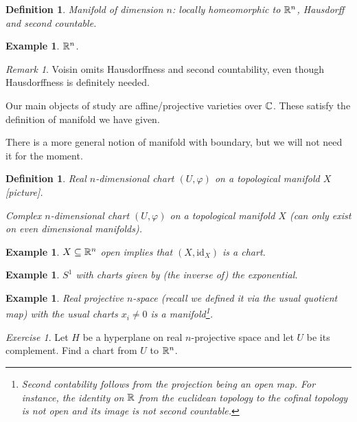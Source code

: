 \documentclass[A4paper, british, reqno]{amsart}
\theoremstyle{darkgreentheorem}
\theoremstyle{darkbluedefinition}
\newtheorem{defn}[thm]{Definition}
\theoremstyle{darkredexample}
\newtheorem{exa}[thm]{Example}
\theoremstyle{remark}
\newtheorem{rem}[thm]{Remark}
\newtheorem{exe}[thm]{Exercise}
\newcommand{\1}{\mathbbm{1}}
\newcommand{\id}{\mathrm{id}}
\begin{document}
\begin{defn}
    Manifold of dimension $n$: locally homeomorphic to $\mathbb{R}^{n}$, Hausdorff and second countable.
\end{defn}

\begin{exa}
    $\mathbb{R}^{n}$.
\end{exa}

\begin{rem}
    Voisin omits Hausdorffness and second countability, even though Hausdorffness is definitely needed.
\end{rem}

Our main objects of study are affine/projective varieties over $\mathbb{C}$.
These satisfy the definition of manifold we have given.

There is a more general notion of manifold with boundary, but we will not need it for the moment.

\begin{defn}
    Real $n$-dimensional chart $(U,\varphi)$ on a topological manifold $X$ [picture].

    Complex $n$-dimensional chart $(U,\varphi)$ on a topological manifold $X$ (can only exist on even dimensional manifolds).
\end{defn}

\begin{exa}
    $X\subseteq \mathbb{R}^{n}$ open implies that $(X,\id_{X})$ is a chart.
\end{exa}

\begin{exa}
    $S^{1}$ with charts given by (the inverse of) the exponential.
\end{exa}

\begin{exa}
    Real projective $n$-space (recall we defined it via the usual quotient map) with the usual charts $x_{i}\neq 0$ is a manifold\footnote{Second contability follows from the projection being an open map. For instance, the identity on $\mathbb{R}$ from the euclidean topology to the cofinal topology is not open and its image is not second countable.}.
\end{exa}

\begin{exe}
    Let $H$ be a hyperplane on real $n$-projective space and let $U$ be its complement.
    Find a chart from $U$ to $\mathbb{R}^{n}$.
\end{exe}
\end{document}
